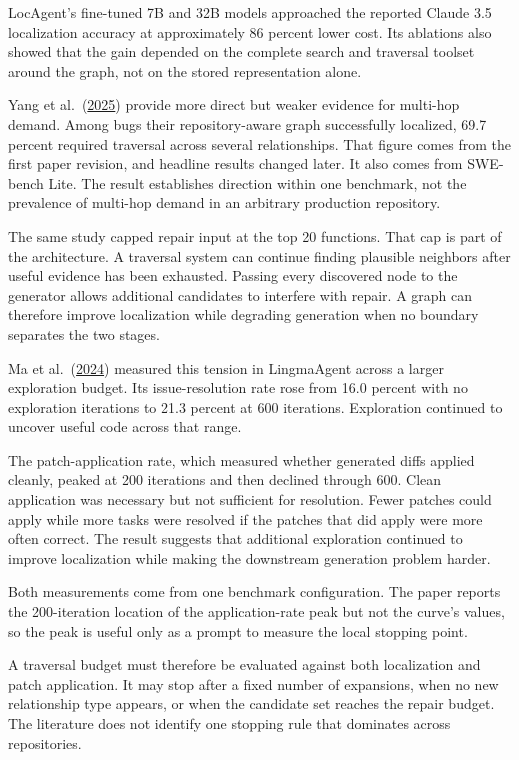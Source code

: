 LocAgent's fine-tuned 7B and 32B models approached the reported Claude 3.5 localization accuracy at approximately 86 percent lower cost. Its ablations also showed that the gain depended on the complete search and traversal toolset around the graph, not on the stored representation alone.

Yang et al.~(\href{https://arxiv.org/abs/2503.21710v1}{2025}) provide more direct but weaker evidence for multi-hop demand. Among bugs their repository-aware graph successfully localized, 69.7 percent required traversal across several relationships. That figure comes from the first paper revision, and headline results changed later. It also comes from SWE-bench Lite. The result establishes direction within one benchmark, not the prevalence of multi-hop demand in an arbitrary production repository.

The same study capped repair input at the top 20 functions. That cap is part of the architecture. A traversal system can continue finding plausible neighbors after useful evidence has been exhausted. Passing every discovered node to the generator allows additional candidates to interfere with repair. A graph can therefore improve localization while degrading generation when no boundary separates the two stages.

Ma et al.~(\href{https://arxiv.org/abs/2406.01422}{2024}) measured this tension in LingmaAgent across a larger exploration budget. Its issue-resolution rate rose from 16.0 percent with no exploration iterations to 21.3 percent at 600 iterations. Exploration continued to uncover useful code across that range.

The patch-application rate, which measured whether generated diffs applied cleanly, peaked at 200 iterations and then declined through 600. Clean application was necessary but not sufficient for resolution. Fewer patches could apply while more tasks were resolved if the patches that did apply were more often correct. The result suggests that additional exploration continued to improve localization while making the downstream generation problem harder.

Both measurements come from one benchmark configuration. The paper reports the 200-iteration location of the application-rate peak but not the curve's values, so the peak is useful only as a prompt to measure the local stopping point.

A traversal budget must therefore be evaluated against both localization and patch application. It may stop after a fixed number of expansions, when no new relationship type appears, or when the candidate set reaches the repair budget. The literature does not identify one stopping rule that dominates across repositories.

